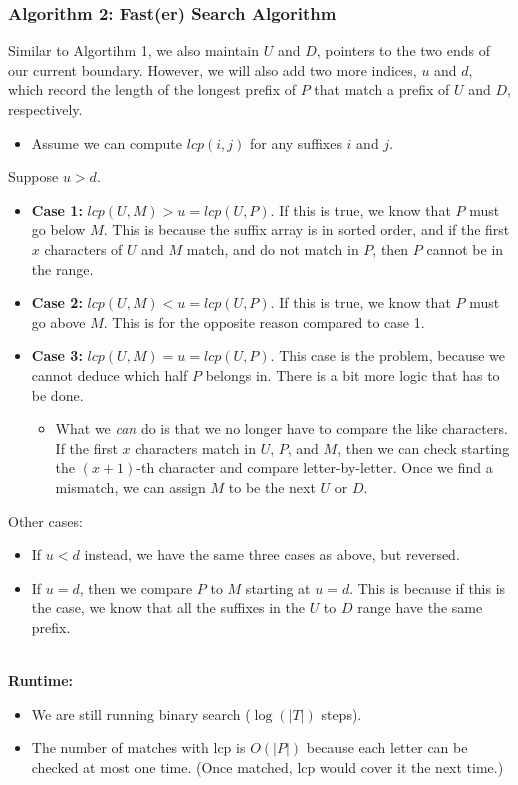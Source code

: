 \documentclass[10pt]{article}
\begin{document}
\subsubsection*{Algorithm 2: Fast(er) Search Algorithm}
Similar to Algortihm 1, we also maintain $U$ and $D$, pointers to the two ends of our current boundary.  However, we will also add two more indices, $u$ and $d$, which record the length of the longest prefix of $P$ that match a prefix of $U$ and $D$, respectively.
\begin{itemize}
	\item Assume we can compute $lcp(i, j)$ for any suffixes $i$ and $j$.
\end{itemize}
Suppose $u > d$.
\begin{itemize}
	\item \textbf{Case 1:} $lcp(U, M) > u = lcp(U, P)$.  If this is true, we know that $P$ must go below $M$.  This is because the suffix array is in sorted order, and if the first $x$ characters of $U$ and $M$ match, and do not match in $P$, then $P$ cannot be in the range.
	\item \textbf{Case 2:} $lcp(U, M) < u = lcp(U, P)$.  If this is true, we know that $P$ must go above $M$.  This is for the opposite reason compared to case 1.
	\item \textbf{Case 3:} $lcp(U, M) = u = lcp(U, P)$.  This case is the problem, because we cannot deduce which half $P$ belongs in.  There is a bit more logic that has to be done.
	\begin{itemize}
	    \item What we \textit{can} do is that we no longer have to compare the like characters.  If the first $x$ characters match in $U$, $P$, and $M$, then we can check starting the $(x+1)$-th character and compare letter-by-letter.  Once we find a mismatch, we can assign $M$ to be the next $U$ or $D$.
    \end{itemize}
\end{itemize}
Other cases:
\begin{itemize}
	\item If $u < d$ instead, we have the same three cases as above, but reversed.
	\item If $u = d$, then we compare $P$ to $M$ starting at $u = d$.  This is because if this is the case, we know that all the suffixes in the $U$ to $D$ range have the same prefix.\\\\
\end{itemize}
\textbf{Runtime:}
\begin{itemize}
	\item We are still running binary search ($\log(|T|)$ steps).
	\item The number of matches with lcp is $O(|P|)$ because each letter can be checked at most one time.  (Once matched, lcp would cover it the next time.)
\end{itemize}
\end{document}
